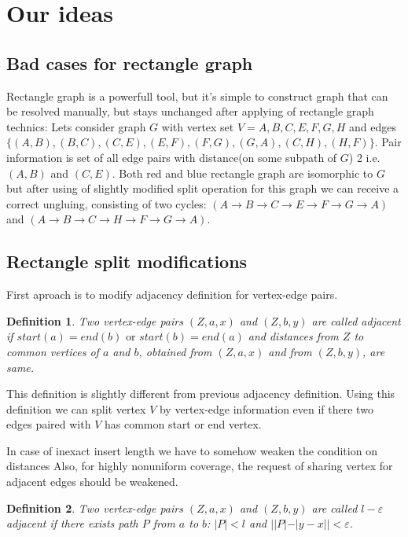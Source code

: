 \documentclass[12pt,a4paper,oneside]{article}
\newtheorem{definition}{Definition}
\def\eps{\varepsilon}
\begin{document}
\section{Our ideas}

\subsection{Bad cases for rectangle graph}
Rectangle graph is a powerfull tool, but it's simple to construct graph that can be resolved manually, but stays unchanged after applying of rectangle graph technics:
Lets consider graph $G$ with vertex set $V = {A,B,C,E,F,G,H}$ and edges $\{(A,B),(B,C),(C,E),(E,F),(F,G),(G,A),(C,H),(H,F)\}$. Pair information is set of all edge pairs with distance(on some subpath of $G$) 2 i.e. $(A,B)$ and $(C,E)$.
Both red and blue rectangle graph are isomorphic to $G$ but after using of slightly modified split operation for this graph we can receive a correct ungluing, consisting of two cycles: $(A\rightarrow B\rightarrow C\rightarrow E\rightarrow F\rightarrow G\rightarrow A)$ and $(A\rightarrow B\rightarrow C\rightarrow H\rightarrow F\rightarrow G\rightarrow A)$.

\subsection{Rectangle split modifications}
First aproach is to modify adjacency definition for vertex-edge pairs.
\begin{definition}
 Two vertex-edge pairs $(Z,a,x)$ and $(Z,b,y)$ are called \emph{adjacent} if $ start (a) = end(b)\text{ or } start(b) = end (a)$ and distances from $Z$ to common vertices of $a$ and $b$, obtained from $(Z,a,x)$ and from $(Z,b,y)$, are same. 
\end{definition}
This definition  is slightly different from previous adjacency definition. Using this definition we can split vertex $V$ by vertex-edge information even if there two edges paired with $V$ has common start or end vertex.   

In case of inexact insert length we have to somehow weaken the condition on distances 
Also, for highly nonuniform coverage, the request of sharing vertex for adjacent edges should be weakened. 

\begin{definition}
 Two vertex-edge pairs $(Z,a,x)$ and $(Z,b,y)$ are called \emph{$l-\eps$ adjacent} if there exists path $P$ from $a$ to $b$: $|P|<l$ and $||P| - |y-x|| < \eps$.   
\end{definition}
\end{document}
